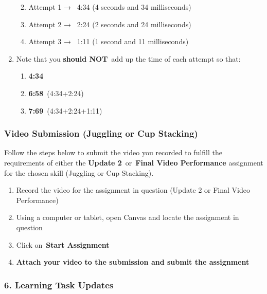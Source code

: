 \documentclass[
  letterpaper,
  DIV=11,
  numbers=noendperiod]{scrartcl}
\providecommand{\tightlist}{%
  \setlength{\itemsep}{0pt}\setlength{\parskip}{0pt}}\usepackage{longtable,booktabs,array}
\begin{document}
\begin{enumerate}
  \begin{enumerate}
  \def\labelenumii{\arabic{enumii}.}
  \tightlist
  \item
    Attempt 1 →~ 4:34 (4 seconds and 34 milliseconds)
  \item
    Attempt 2 →~ 2:24 (2 seconds and 24 milliseconds)
  \item
    Attempt 3 →~ 1:11 (1 second and 11 milliseconds)
  \end{enumerate}
\item
  Note that you \textbf{should NOT}~add up the time of each attempt so
  that:

  \begin{enumerate}
  \def\labelenumii{\arabic{enumii}.}
  \tightlist
  \item
    \textbf{4:34}
  \item
    \textbf{6:58}~(4:34+2:24)
  \item
    \textbf{7:69}~(4:34+2:24+1:11)
  \end{enumerate}
\end{enumerate}

\hypertarget{video-submission-juggling-or-cup-stacking}{%
\subsubsection{Video Submission (Juggling or Cup
Stacking)}\label{video-submission-juggling-or-cup-stacking}}

Follow the steps below to submit the video you recorded to fulfill the
requirements of either the \textbf{Update 2}~or~\textbf{Final Video
Performance} assignment for the chosen skill (Juggling or Cup Stacking).

\begin{enumerate}
\def\labelenumi{\arabic{enumi}.}
\item
  Record the video for the assignment in question (Update 2 or Final
  Video Performance)
\item
  Using a computer or tablet, open Canvas and locate the assignment in
  question
\item
  Click on~\textbf{Start Assignment}
\item
  \textbf{Attach your video to the submission and submit the assignment}
\end{enumerate}

\hypertarget{learning-task-updates-1}{%
\subsubsection{6. Learning Task Updates}\label{learning-task-updates-1}}
\end{document}
